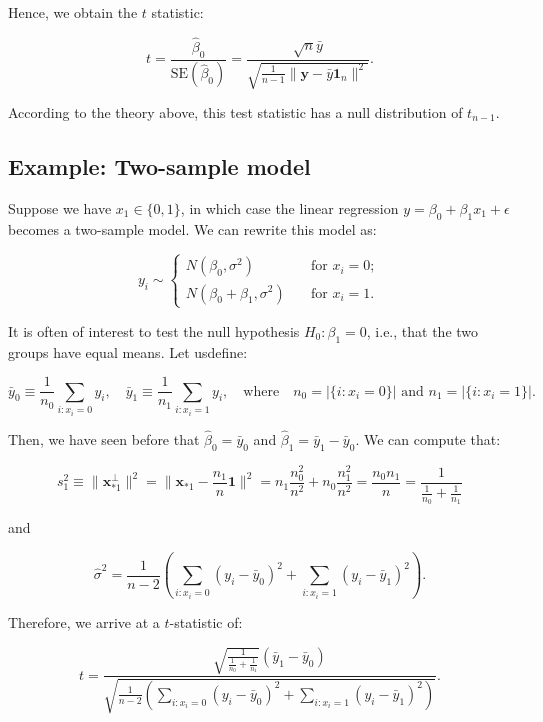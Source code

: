 \documentclass[
  11pt,
  letterpaper,
  oneside]{book}
\theoremstyle{plain}
\theoremstyle{plain}
\theoremstyle{definition}
\theoremstyle{definition}
\theoremstyle{plain}
\theoremstyle{remark}
\begin{document}
Hence, we obtain the \(t\) statistic:

\[
t = \frac{\widehat{\beta}_0}{\text{SE}(\widehat{\beta}_0)} = \frac{\sqrt{n} \bar{y}}{\sqrt{\frac{1}{n-1}\|\boldsymbol{y} - \bar{y} \boldsymbol{1}_n\|^2}}.
\]

According to the theory above, this test statistic has a null
distribution of \(t_{n-1}\).

\hypertarget{example-two-sample-model}{%
\subsection{Example: Two-sample model}\label{example-two-sample-model}}

Suppose we have \(x_1 \in \{0,1\}\), in which case the linear regression
\(y = \beta_0 + \beta_1 x_1 + \epsilon\) becomes a two-sample model. We
can rewrite this model as:

\[
y_i \sim \begin{cases}
N(\beta_0, \sigma^2) \quad &\text{for } x_i = 0; \\
N(\beta_0 + \beta_1, \sigma^2) \quad &\text{for } x_i = 1.
\end{cases}
\]

It is often of interest to test the null hypothesis
\(H_0: \beta_1 = 0\), i.e., that the two groups have equal means. Let
usdefine:

\[
\bar{y}_0 \equiv \frac{1}{n_0}\sum_{i: x_i = 0} y_i, \quad \bar{y}_1 \equiv \frac{1}{n_1}\sum_{i: x_i = 1} y_i, \quad \text{where} \quad n_0 = |\{i: x_i = 0\}| \text{ and } n_1 = |\{i: x_i = 1\}|.
\]

Then, we have seen before that \(\widehat{\beta}_0 = \bar{y}_0\) and
\(\widehat{\beta}_1 = \bar{y}_1 - \bar{y}_0\). We can compute that:

\[
s_1^2 \equiv \|\boldsymbol{x}_{*1}^{\perp}\|^2 = \|\boldsymbol{x}_{*1} - \frac{n_1}{n}\boldsymbol{1}\|^2 = n_1\frac{n_0^2}{n^2} + n_0\frac{n_1^2}{n^2} = \frac{n_0 n_1}{n} = \frac{1}{\frac{1}{n_0} + \frac{1}{n_1}}
\]

and

\[
\widehat{\sigma}^2 = \frac{1}{n-2}\left(\sum_{i: x_i = 0}(y_i - \bar{y}_0)^2 + \sum_{i: x_i = 1}(y_i - \bar{y}_1)^2\right).
\]

Therefore, we arrive at a \(t\)-statistic of:

\[
t = \frac{\sqrt{\frac{1}{\frac{1}{n_0} + \frac{1}{n_1}}}(\bar{y}_1 - \bar{y}_0)}{\sqrt{\frac{1}{n-2}\left(\sum_{i: x_i = 0}(y_i - \bar{y}_0)^2 + \sum_{i: x_i = 1}(y_i - \bar{y}_1)^2\right)}}.
\]
\end{document}
